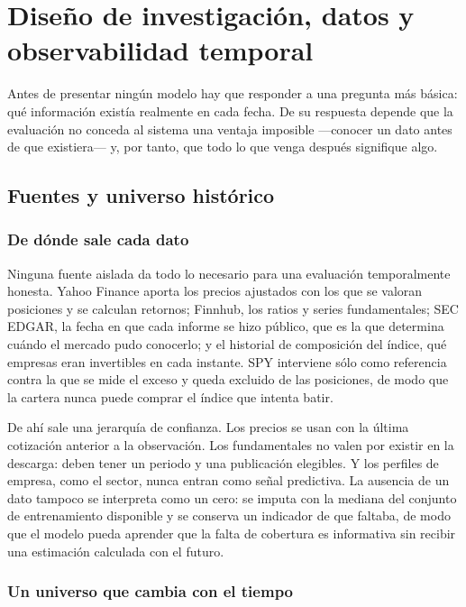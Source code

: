 \chapter{Diseño de investigación, datos y observabilidad temporal}
\label{chap:datos}

Antes de presentar ningún modelo hay que responder a una pregunta más básica: qué información existía
realmente en cada fecha. De su respuesta depende que la evaluación no conceda al sistema una ventaja
imposible ---conocer un dato antes de que existiera--- y, por tanto, que todo lo que venga después
signifique algo.

\section{Fuentes y universo histórico}

\subsection{De dónde sale cada dato}

Ninguna fuente aislada da todo lo necesario para una evaluación temporalmente honesta. Yahoo Finance
aporta los precios ajustados con los que se valoran posiciones y se calculan retornos; Finnhub, los
ratios y series fundamentales; SEC EDGAR, la fecha en que cada informe se hizo público, que es la
que determina cuándo el mercado pudo conocerlo; y el historial de composición del índice, qué
empresas eran invertibles en cada instante. SPY interviene sólo como referencia contra la que se
mide el exceso y queda excluido de las posiciones, de modo que la cartera nunca puede comprar el
índice que intenta batir.

De ahí sale una jerarquía de confianza. Los precios se usan con la última cotización anterior a la
observación. Los fundamentales no valen por existir en la descarga: deben tener un periodo y una
publicación elegibles. Y los perfiles de empresa, como el sector, nunca entran como señal
predictiva. La ausencia de un dato tampoco se interpreta como un cero: se imputa con la mediana del
conjunto de entrenamiento disponible y se conserva un indicador de que faltaba, de modo que el
modelo pueda aprender que la falta de cobertura es informativa sin recibir una estimación calculada
con el futuro.

\subsection{Un universo que cambia con el tiempo}

